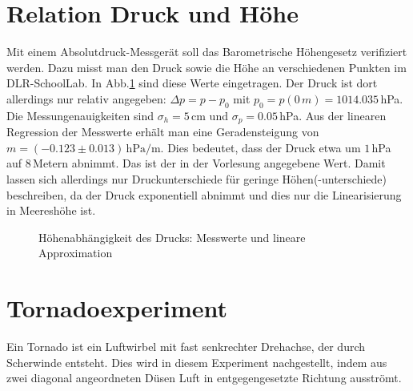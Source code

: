 \documentclass[12pt,a4paper,headinclude,bibtotoc]{scrartcl}
\begin{document}
\section{Relation Druck und Höhe}
Mit einem Absolutdruck-Messgerät soll das Barometrische Höhengesetz verifiziert werden.
Dazu misst man den Druck sowie die Höhe an verschiedenen Punkten im DLR-SchoolLab.
In Abb.\ref{fig:druckHoehe} sind diese Werte eingetragen.
Der Druck ist dort allerdings nur relativ angegeben: $\Delta p = p-p_0$ mit $p_0=p(0\,\si{m})=1014.035\,$hPa.
Die Messungenauigkeiten sind $\sigma_h=5\,$cm und $\sigma_p=0.05\,$hPa.
Aus der linearen Regression der Messwerte erhält man eine Geradensteigung von $m=(-0.123 \pm 0.013)\,\si{\hecto\pascal\per\meter}$.
Dies bedeutet, dass der Druck etwa um $1\,$hPa auf $8\,$Metern abnimmt.
Das ist der in der Vorlesung angegebene Wert.
Damit lassen sich allerdings nur Druckunterschiede für geringe Höhen(-unterschiede) beschreiben, da der Druck exponentiell abnimmt und dies nur die Linearisierung in Meereshöhe ist.
\begin{figure}[!htb]
	\centering
	\begin{minipage}{0.7\textwidth}
		\resizebox{\textwidth}{!}{   		
   		}
		\caption{Höhenabhängigkeit des Drucks: Messwerte und lineare Approximation}
		\label{fig:druckHoehe}
	\end{minipage}
\end{figure}

\section{Tornadoexperiment}
Ein Tornado ist ein Luftwirbel mit fast senkrechter Drehachse, der durch Scherwinde entsteht.
Dies wird in diesem Experiment nachgestellt, indem aus zwei diagonal angeordneten Düsen Luft in entgegengesetzte Richtung ausströmt.
\end{document}
